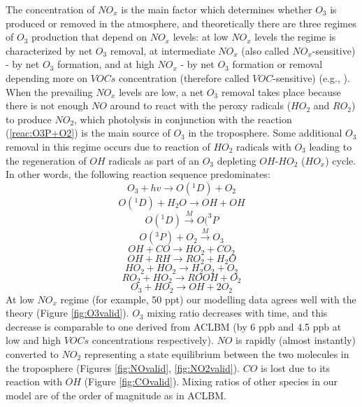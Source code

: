 \documentclass[11pt,a4paper]{article}
\begin{document}
The concentration of $NO_x$ is the main factor which determines whether $O_3$ is produced or removed in the atmosphere, and theoretically there are three regimes of $O_3$ production that depend on $NO_x$ levels: at low $NO_x$ levels the regime is characterized by net $O_3$ removal, at intermediate $NO_x$ (also called $NO_x$-sensitive) - by net $O_3$ formation, and at high $NO_x$ - by net $O_3$ formation or removal depending more on $VOCs$ concentration (therefore called $VOC$-sensitive) (e.g., \citep{Fowler2008}). When the prevailing $NO_x$ levels are low, a net $O_3$ removal takes place because there is not enough $NO$ around to react with the peroxy radicals ($HO_2$ and $RO_2$) to produce $NO_2$, which photolysis in conjunction with the reaction (\ref{reac:O3P+O2}) is the main source of $O_3$ in the troposphere. Some additional $O_3$ removal in this regime occurs due to reaction of $HO_2$ radicals with $O_3$ leading to the regeneration of $OH$ radicals as part of an $O_3$ depleting $OH$-$HO_2$ ($HO_x$) cycle. In other words, the following reaction sequence predominates:
\begin{equation}\label{reac:O3+hv}
O_3 + hv \rightarrow O(^1D) + O_2
\end{equation}
\begin{equation}\label{reac:O1D+H2O}
O(^1D) + H_2O \rightarrow OH + OH
\end{equation}
\begin{equation}\label{reac:O1D=O3P}
O(^1D) \xrightarrow{M} O(^3P
\end{equation}
\begin{equation}\label{reac:O3P+O2}
O(^3P) + O_2 \xrightarrow{M} O_3
\end{equation}
\begin{equation}\label{reac:OH+CO}
OH + CO \rightarrow HO_2 + CO_2
\end{equation}
\begin{equation}\label{reac:OH+RH}
OH + RH \rightarrow RO_2 + H_2O
\end{equation}
\begin{equation}\label{reac:HO2+HO2}
HO_2 + HO_2 \rightarrow H_2O_2 + O_2
\end{equation}
\begin{equation}\label{reac:RO2+HO2}
RO_2 + HO_2 \rightarrow ROOH + O_2
\end{equation}
\begin{equation}\label{reac:O3+HO2}
O_3 + HO_2 \rightarrow OH + 2O_2
\end{equation}
At low $NO_x$ regime (for example, 50 ppt) our modelling data agrees well with the theory (Figure \ref{fig:O3valid}). $O_3$ mixing ratio decreases with time, and this decrease is comparable to one derived from ACLBM (by 6 ppb and 4.5 ppb at low and high $VOCs$ concentrations respectively). $NO$ is rapidly (almost instantly) converted to $NO_2$ representing a state equilibrium between the two molecules in the troposphere (Figures \ref{fig:NOvalid}, \ref{fig:NO2valid}). $CO$ is lost due to its reaction with $OH$ (Figure \ref{fig:COvalid}). Mixing ratios of other species in our model are of the order of magnitude as in ACLBM.
\end{document}
